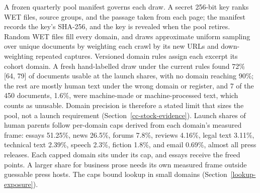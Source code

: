 A frozen quarterly pool manifest governs each draw. A secret 256-bit key ranks
WET files, source groups, and the passage taken from each page; the manifest
records the key's SHA-256, and the key is revealed when the pool retires. Random
WET files fill every domain, and draws approximate uniform sampling over unique
documents by weighting each crawl by its new URLs and down-weighting repeated
captures. Versioned domain rules assign each excerpt its cohort domain. A fresh
hand-labelled draw under the current rules found 72\% [64, 79] of documents
usable at the launch shares, with no domain reaching 90\%; the rest are mostly
human text under the wrong domain or register, and 7 of the 450 documents,
1.6\%, were machine-made or machine-processed text, which counts as
unusable. Domain precision is therefore a stated
limit that sizes the pool, not a launch requirement
(Section~\ref{cc-stock-evidence}). Launch shares of human parents follow
per-domain caps derived from each domain's measured frame: essays 51.25\%, news
26.5\%, forums 7.8\%, reviews 4.16\%, legal text 3.11\%, technical text 2.39\%,
speech 2.3\%, fiction 1.8\%, and email 0.69\%, almost all press releases. Each
capped domain sits under its cap, and essays receive the freed points. A larger
share for business prose needs its own measured frame outside guessable press
hosts. The caps bound lookup in small domains (Section~\ref{lookup-exposure}).

